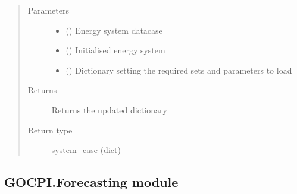 \documentclass[a4paper,12pt,english]{article}
\begin{document}
\begin{fulllineitems}
\begin{fulllineitems}
\begin{description}
\end{description}
\begin{quote}\begin{description}
\item[{Parameters}] \leavevmode\begin{itemize}
\item {} 
 () \textendash{} Energy system datacase

\item {} 
 () \textendash{} Initialised energy system

\item {} 
 () \textendash{} Dictionary setting the required sets and parameters to load

\end{itemize}

\item[{Returns}] \leavevmode
Returns the updated dictionary

\item[{Return type}] \leavevmode
system\_case (dict)

\end{description}\end{quote}

\end{fulllineitems}


\end{fulllineitems}



\subsection{GOCPI.Forecasting module}
\label{\detokenize{GOCPI:module-GOCPI.Forecasting}}\label{\detokenize{GOCPI:gocpi-forecasting-module}}
\end{document}
